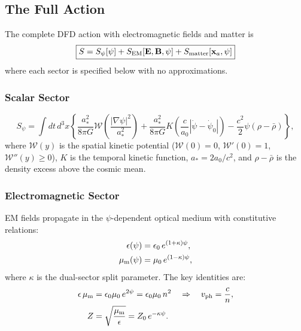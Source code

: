 \documentclass[aps,prd,twocolumn,superscriptaddress,floatfix,nofootinbib]{revtex4-2}
\newcommand{\astar}{a_*}
\newcommand{\azero}{a_0}
\newcommand{\Wfunc}{\mathcal{W}}
\newcommand{\kap}{\kappa}
\begin{document}
\subsection{The Full Action}\label{sec:full-action}

The complete DFD action with electromagnetic fields and matter is
\begin{equation}
\boxed{S = S_\psi[\psi] + S_{\rm EM}[\mathbf{E},\mathbf{B},\psi]
+ S_{\rm matter}[\mathbf{x}_a,\psi]}
\label{eq:full-action}
\end{equation}
where each sector is specified below with no approximations.

\subsubsection{Scalar Sector}

\begin{equation}
S_\psi = \int dt\,d^3x\left\{
  \frac{\astar^2}{8\pi G}\Wfunc\!\left(\frac{|\nabla\psi|^2}{\astar^2}\right)
  + \frac{\astar^2}{8\pi G}K\!\left(\frac{c}{\azero}|\dot\psi - \dot\psi_0|\right)
  - \frac{c^2}{2}\psi(\rho - \bar{\rho})
\right\},
\label{eq:S-psi}
\end{equation}
where $\Wfunc(y)$ is the spatial kinetic potential ($\Wfunc(0)=0$,
$\Wfunc'(0)=1$, $\Wfunc''(y) \geq 0$), $K$ is the temporal kinetic
function, $\astar = 2\azero/c^2$, and $\rho - \bar{\rho}$ is the
density excess above the cosmic mean.

\subsubsection{Electromagnetic Sector}

EM fields propagate in the $\psi$-dependent optical medium with
constitutive relations:
\begin{align}
\epsilon(\psi) &= \epsilon_0\,e^{(1+\kap)\psi}, \label{eq:eps}\\
\mu_{\rm m}(\psi) &= \mu_0\,e^{(1-\kap)\psi}, \label{eq:mum}
\end{align}
where $\kap$ is the dual-sector split parameter. The key identities are:
\begin{align}
\epsilon\,\mu_{\rm m} &= \epsilon_0\mu_0\,e^{2\psi} = \epsilon_0\mu_0\,n^2
\quad\Rightarrow\quad v_{\rm ph} = \frac{c}{n}, \label{eq:phase-vel}\\
Z &= \sqrt{\frac{\mu_{\rm m}}{\epsilon}} = Z_0\,e^{-\kap\psi}.
\label{eq:impedance}
\end{align}
\end{document}
